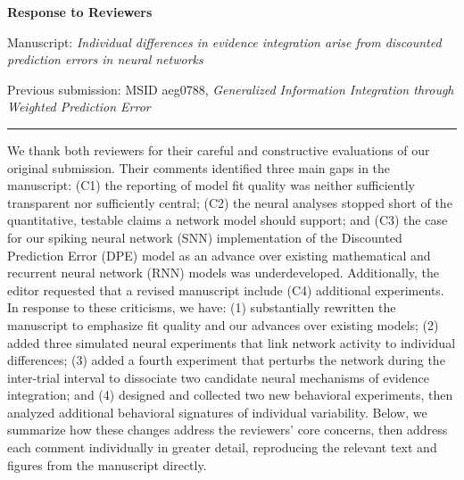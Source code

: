 \usepackage[numbers,sort&compress]{natbib}


\setlength{\parindent}{0pt}
\setlength{\parskip}{0.7em}

\newcommand{\rc}[2]{\textbf{#1}\quad{\small\color{revred}``#2''}}

\date{}



\begin{center}
	{\large\bfseries Response to Reviewers}

	\vspace{0.6em}

	Manuscript: \textit{Individual differences in evidence integration arise from discounted prediction errors in neural networks}

	Previous submission: MSID aeg0788, \textit{Generalized Information Integration through Weighted Prediction Error}
\end{center}

\vspace{0.8em}

\hrule

\vspace{0.8em}

We thank both reviewers for their careful and constructive evaluations of our original submission. Their comments identified three main gaps in the manuscript: (C1) the reporting of model fit quality was neither sufficiently transparent nor sufficiently central; (C2) the neural analyses stopped short of the quantitative, testable claims a network model should support; and (C3) the case for our spiking neural network (SNN) implementation of the Discounted Prediction Error (DPE) model as an advance over existing mathematical and recurrent neural network (RNN) models was underdeveloped. Additionally, the editor requested that a revised manuscript include (C4) additional experiments. In response to these criticisms, we have: (1) substantially rewritten the manuscript to emphasize fit quality and our advances over existing models; (2) added three simulated neural experiments that link network activity to individual differences; (3) added a fourth experiment that perturbs the network during the inter-trial interval to dissociate two candidate neural mechanisms of evidence integration; and (4) designed and collected two new behavioral experiments, then analyzed additional behavioral signatures of individual variability. Below, we summarize how these changes address the reviewers' core concerns, then address each comment individually in greater detail, reproducing the relevant text and figures from the manuscript directly.


